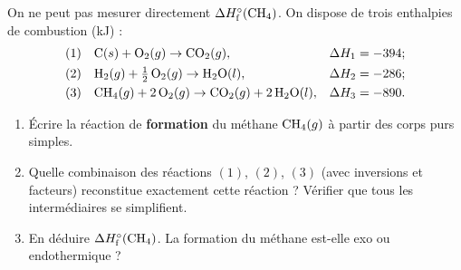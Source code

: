 \documentclass[11pt,a4paper]{article}
\newcommand{\dH}{\Delta H}
\newcommand{\dHf}{\Delta H^{\circ}_{\text{f}}}
\begin{document}
\begin{center}
\end{center}

\begin{exercice}
On ne peut pas mesurer directement $\dHf(\ce{CH4})$. On dispose de trois enthalpies de combustion
(\si{\kilo\joule}) :
\begin{align*}
(1)\quad & \ce{C}(s) + \ce{O2}(g) \rightarrow \ce{CO2}(g), & \dH_1 &= -394 ; \\
(2)\quad & \ce{H2}(g) + \tfrac12\,\ce{O2}(g) \rightarrow \ce{H2O}(l), & \dH_2 &= -286 ; \\
(3)\quad & \ce{CH4}(g) + 2\,\ce{O2}(g) \rightarrow \ce{CO2}(g) + 2\,\ce{H2O}(l), & \dH_3 &= -890 .
\end{align*}
\begin{enumerate}[label=\alph*),leftmargin=2em,topsep=2pt,itemsep=2pt]
  \item Écrire la réaction de \textbf{formation} du méthane $\ce{CH4}(g)$ à partir des corps purs simples.
  \item Quelle combinaison des réactions $(1)$, $(2)$, $(3)$ (avec inversions et facteurs) reconstitue
        exactement cette réaction ? Vérifier que tous les intermédiaires se simplifient.
  \item En déduire $\dHf(\ce{CH4})$. La formation du méthane est-elle exo ou endothermique ?
\end{enumerate}
\end{exercice}
\end{document}
